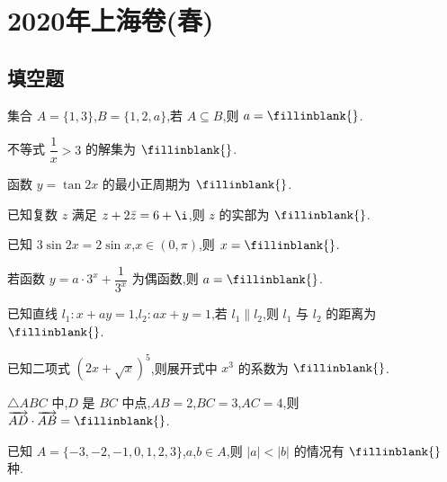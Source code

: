 \chapter{2020年上海卷(春)}

\section{填空题}

\begin{problem}
集合 \(A=\{1,3\}\),\(B=\{1,2,a\}\),若 \(A\subseteq B\),则 \(a=\fillinblank{}\).
\end{problem}

\begin{problem}
不等式 \(\dfrac{1}{x}>3\) 的解集为 \(\fillinblank{}\).
\end{problem}

\begin{problem}
函数 \(y=\tan 2x\) 的最小正周期为 \(\fillinblank{}\).
\end{problem}

\begin{problem}
已知复数 \(z\) 满足 \(z+2\bar z=6+\i\),则 \(z\) 的实部为 \(\fillinblank{}\).
\end{problem}

\begin{problem}
已知 \(3\sin 2x=2\sin x\),\(x\in(0,\pi)\),则 \(x=\fillinblank{}\).
\end{problem}

\begin{problem}
若函数 \(y=a\cdot3^x+\dfrac{1}{3^x}\) 为偶函数,则 \(a=\fillinblank{}\).
\end{problem}

\begin{problem}
已知直线 \(l_1:x+ay=1\),\(l_2:ax+y=1\),若 \(l_1\parallel l_2\),则 \(l_1\) 与 \(l_2\) 的距离为 \(\fillinblank{}\).
\end{problem}

\begin{problem}
已知二项式 \((2x+\sqrt{x})^5\),则展开式中 \(x^3\) 的系数为 \(\fillinblank{}\).
\end{problem}

\begin{problem}
\(\triangle ABC\) 中,\(D\) 是 \(BC\) 中点,\(AB=2\),\(BC=3\),\(AC=4\),则 \(\overrightarrow{AD}\cdot\overrightarrow{AB}=\fillinblank{}\).
\end{problem}

\begin{problem}
已知 \(A=\{-3,-2,-1,0,1,2,3\}\),\(a\),\(b\in A\),则 \(|a|<|b|\) 的情况有 \(\fillinblank{}\) 种.
\end{problem}

